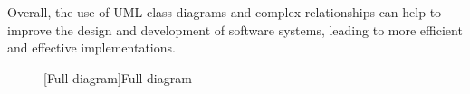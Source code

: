 \documentclass[
	12pt,
    a4paper,
    egregdoesnotlikesansseriftitles, %
    toc=chapterentrywithdots,
    oneside, openany,
    titlepage,
    parskip=half,
    headings=normal,  %
    listof=totoc,
    bibliography=totocnumbered,
    index=totoc,
    captions=tableheading,  %
    listof=flat,
    numbers=noenddot, %
    final]
    {scrbook}
\begin{document}
Overall, the use of UML class diagrams and complex relationships can help to improve the design and development of software systems, leading to more efficient and effective implementations.

\begin{figure}[p]
	\centering
	[Full diagram]{Full diagram}
	\label{fig:full}
\end{figure}



\backmatter

\printnoidxglossary[title=Glossary,nonumberlist]

%
%
%
\printbibliography

\clearpage %




\end{document}

